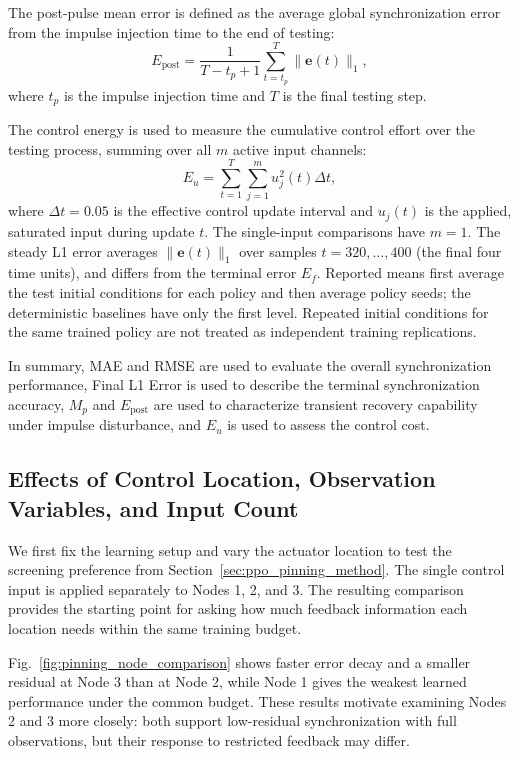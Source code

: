 \documentclass[a4paper,fleqn]{cas-dc}
\theoremstyle{plain}
\theoremstyle{definition}
\begin{document}
The post-pulse mean error is defined as the average global synchronization error from the impulse injection time to the end of testing:
\begin{equation}
	E_{\mathrm{post}}
	=
	\frac{1}{T-t_p+1}
	\sum_{t=t_p}^{T}
	\|\mathbf{e}(t)\|_1,
	\label{eq:post_pulse_mean_error}
\end{equation}
where $t_p$ is the impulse injection time and $T$ is the final testing step.

The control energy is used to measure the cumulative control effort over the testing process, summing over all $m$ active input channels:
\begin{equation}
	E_u=
	\sum_{t=1}^{T}
	\sum_{j=1}^{m}u_j^2(t)\Delta t,
	\label{eq:control_energy}
\end{equation}
where $\Delta t=0.05$ is the effective control update interval and $u_j(t)$ is the applied, saturated input during update $t$. The single-input comparisons have $m=1$. The steady L1 error averages $\|\mathbf e(t)\|_1$ over samples $t=320,\ldots,400$ (the final four time units), and differs from the terminal error $E_f$. Reported means first average the test initial conditions for each policy and then average policy seeds; the deterministic baselines have only the first level. Repeated initial conditions for the same trained policy are not treated as independent training replications.

In summary, MAE and RMSE are used to evaluate the overall synchronization performance, Final L1 Error is used to describe the terminal synchronization accuracy, $M_p$ and $E_{\mathrm{post}}$ are used to characterize transient recovery capability under impulse disturbance, and $E_u$ is used to assess the control cost.

\subsection{Effects of Control Location, Observation Variables, and Input Count}
\label{subsec:node_selection_observation}

We first fix the learning setup and vary the actuator location to test the screening preference from Section~\ref{sec:ppo_pinning_method}. The single control input is applied separately to Nodes 1, 2, and 3. The resulting comparison provides the starting point for asking how much feedback information each location needs within the same training budget.

Fig.~\ref{fig:pinning_node_comparison} shows faster error decay and a smaller residual at Node 3 than at Node 2, while Node 1 gives the weakest learned performance under the common budget. These results motivate examining Nodes 2 and 3 more closely: both support low-residual synchronization with full observations, but their response to restricted feedback may differ.
\end{document}
